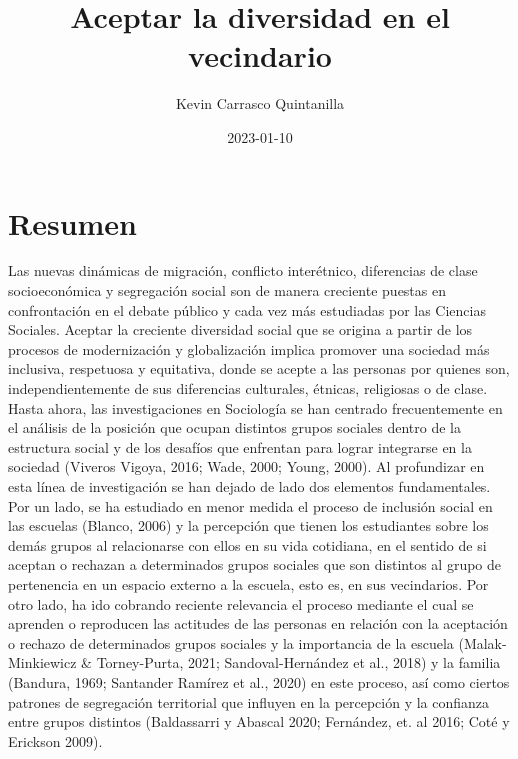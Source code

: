 \documentclass[12pt,twoside]{templates/facsothesis}
\title{Aceptar la diversidad en el vecindario}
\author{Kevin Carrasco Quintanilla}
\date{2023-01-10}
\begin{document}

  \maketitle

\frontmatter %
\pagestyle{empty} %



  \setcounter{tocdepth}{1}
  \setlength{\parskip}{0pt}
  \tableofcontents

\setlength\parskip{1em plus 0.1em minus 0.2em}

  \listoftables

  \listoffigures



\mainmatter %
\pagestyle{fancyplain} %

\hypertarget{resumen}{%
\chapter*{Resumen}\label{resumen}}

Las nuevas dinámicas de migración, conflicto interétnico, diferencias de clase socioeconómica y segregación social son de manera creciente puestas en confrontación en el debate público y cada vez más estudiadas por las Ciencias Sociales. Aceptar la creciente diversidad social que se origina a partir de los procesos de modernización y globalización implica promover una sociedad más inclusiva, respetuosa y equitativa, donde se acepte a las personas por quienes son, independientemente de sus diferencias culturales, étnicas, religiosas o de clase. Hasta ahora, las investigaciones en Sociología se han centrado frecuentemente en el análisis de la posición que ocupan distintos grupos sociales dentro de la estructura social y de los desafíos que enfrentan para lograr integrarse en la sociedad (Viveros Vigoya, 2016; Wade, 2000; Young, 2000). Al profundizar en esta línea de investigación se han dejado de lado dos elementos fundamentales. Por un lado, se ha estudiado en menor medida el proceso de inclusión social en las escuelas (Blanco, 2006) y la percepción que tienen los estudiantes sobre los demás grupos al relacionarse con ellos en su vida cotidiana, en el sentido de si aceptan o rechazan a determinados grupos sociales que son distintos al grupo de pertenencia en un espacio externo a la escuela, esto es, en sus vecindarios. Por otro lado, ha ido cobrando reciente relevancia el proceso mediante el cual se aprenden o reproducen las actitudes de las personas en relación con la aceptación o rechazo de determinados grupos sociales y la importancia de la escuela (Malak-Minkiewicz \& Torney-Purta, 2021; Sandoval-Hernández et al., 2018) y la familia (Bandura, 1969; Santander Ramírez et al., 2020) en este proceso, así como ciertos patrones de segregación territorial que influyen en la percepción y la confianza entre grupos distintos (Baldassarri y Abascal 2020; Fernández, et. al 2016; Coté y Erickson 2009).
\end{document}

